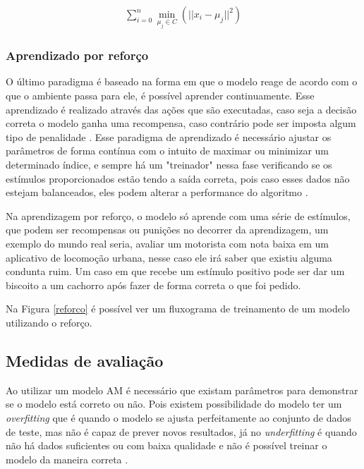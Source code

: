           \begin{equation}\label{kmeans}
            \begin{aligned}
              \sum_{i=0}^{n}\min_{\mu_j \in C}(||x_i - \mu_j||^2)
          \end{aligned} 
          \end{equation}



    \subsubsection{Aprendizado por reforço}

          O último paradigma é baseado na forma em que o modelo reage de acordo com o que o ambiente passa para ele, é possível aprender
          continuamente. Esse aprendizado é realizado através das ações que são executadas, caso seja a decisão correta o modelo ganha uma recompensa, caso
          contrário pode ser imposta algum tipo de penalidade \cite{zurada}. Esse paradigma de aprendizado é necessário ajustar os parâmetros de forma
          contínua com o intuito de maximar ou minimizar um determinado índice, e sempre há um "treinador" nessa fase verificando se os estímulos proporcionados
          estão tendo a saída correta, pois caso esses dados não estejam balanceados, eles podem alterar a performance do algoritmo \cite{mazurowski2008training}.


          Na aprendizagem por reforço, o modelo só aprende com uma série de estímulos, que podem ser recompensas ou punições no decorrer da aprendizagem, 
          um exemplo do mundo real seria, avaliar um motorista com nota baixa em um aplicativo de locomoção urbana, nesse caso ele irá saber que existiu
          alguma condunta ruim. Um caso em que recebe um estímulo positivo pode ser dar um biscoito a um cachorro após fazer de forma correta o que foi pedido.

          Na Figura \ref{reforco} é possível ver um fluxograma de treinamento de um modelo utilizando o reforço.


  \subsection{Medidas de avaliação}
          Ao utilizar um modelo \acrshort{AM} é necessário que existam parâmetros para demonstrar se o modelo está correto ou não. Pois existem 
          possibilidade do modelo ter um \textit{overfitting} que é quando o modelo se ajusta perfeitamente ao conjunto de dados de teste, mas não é capaz
          de prever novos resultados, já no \textit{underfitting} é quando não há dados suficientes ou com baixa qualidade e não é possível treinar o modelo 
          da maneira correta \cite{van2010process}.
          
